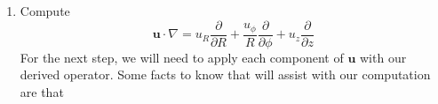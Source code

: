 \documentclass[a4paper]{article}
\begin{document}
\begin{enumerate}[label=(\alph*)]
	Following this, we convert the differential operators. Assisting in this endeavor is the total derivative:
	\begin{align*}
		\frac{\partial }{\partial x} & = \frac{\partial R}{\partial x}\frac{\partial }{\partial R} + \frac{\partial \phi}{\partial x}\frac{\partial }{\partial \phi} \\
		 & = \cos\!\left(\phi\right)\frac{\partial }{\partial R} - \frac{\sin\!\left(\phi\right)}{R}\frac{\partial }{\partial \phi} \\ 
		\frac{\partial }{\partial y} & = \frac{\partial R}{\partial y}\frac{\partial }{\partial R} + \frac{\partial \phi}{\partial y}\frac{\partial }{\partial \phi} \\
					     & = \sin\!\left(\phi\right)\frac{\partial }{\partial R} + \frac{\cos\!\left(\phi\right)}{R}\frac{\partial }{\partial \phi}
	\end{align*}
	where the partial derivatives can be derived from the definitions of \( R \) and \( \phi \). Substituting these pieces into the Cartesian gradient operator gives us
	\begin{alignat*}{2}
		& \!\left( \cos\!\left(\phi\right)\pmb{e}_{R} - \sin\!\left(\phi\right)\pmb{e}_{\theta} \right)\!\left( \cos\!\left(\phi\right)\frac{\partial }{\partial R} - \frac{\sin\!\left(\phi\right)}{R}\frac{\partial }{\partial \phi} \right) & \\
		& \quad + \!\left( \sin\!\left(\phi\right)\pmb{e}_{R} + \cos\!\left(\phi\right)\pmb{e}_{\theta} \right)\!\left( \sin\!\left(\phi\right)\frac{\partial }{\partial R} + \frac{\cos\!\left(\phi\right)}{R}\frac{\partial }{\partial \phi} \right) + \pmb{e}_{z}\frac{\partial }{\partial z} & \\
		& \qquad = \pmb{e}_{R}\frac{\partial }{\partial R} + \pmb{e}_{\phi}\frac{1}{R}\frac{\partial }{\partial \phi} + \pmb{e}_{z}\frac{\partial }{\partial z} &
	\end{alignat*}
	For \( \pmb{u} = \pmb{e}_{R}u_{R} + \pmb{e}_{\phi}u_{\phi} + \pmb{e}_{z}u_{z} \),
	\[
		\nabla \cdot \pmb{u} = \frac{\partial u_{R}}{\partial R} + \frac{1}{R}\frac{\partial u_{\phi}}{\partial \phi} + \frac{\partial u_{z}}{\partial z}
	\]
	\setcounter{enumi}{4}
	\item Compute
	\[
		\pmb{u} \cdot \nabla = u_{R}\frac{\partial }{\partial R} + \frac{u_{\phi}}{R}\frac{\partial }{\partial \phi} + u_{z}\frac{\partial }{\partial z} 
	\]
	For the next step, we will need to apply each component of \( \pmb{u} \) with our derived operator. Some facts to know that will assist with our computation are that

\end{enumerate}
\end{document}
